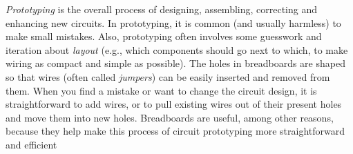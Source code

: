 \emph{Prototyping} is the overall process of designing, assembling, correcting and enhancing new circuits.
In prototyping, it is common (and usually harmless) to make small mistakes.
Also, prototyping often involves some guesswork and iteration about \emph{layout} (e.g., which components should go next to which, to make wiring as compact and simple as possible).
The holes in breadboards are shaped so that wires (often called \emph{jumpers}) can be easily inserted and removed from them.
When you find a mistake or want to change the circuit design, it is straightforward to add wires, or to pull existing wires out of their present holes and move them into new holes.
Breadboards are useful, among other reasons, because they help make this process of circuit prototyping more straightforward and efficient

